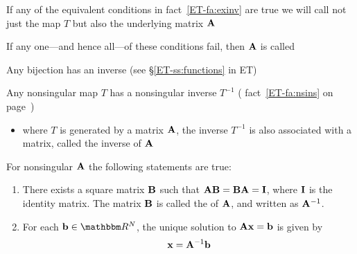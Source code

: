 \begin{frame}

    \vspace{2em}
    If any of the equivalent conditions in
    fact~\ref{ET-fa:exinv} are true we will call not just the map $T$ but also the
    underlying matrix $\mathbf A$ 
    
    \vspace{.7em}
    If any one---and hence all---of
    these conditions fail, then $\mathbf A$ is called 
    
\end{frame}

\begin{frame}
    
    \vspace{2em}
    Any bijection has an inverse (see \S\ref{ET-ss:functions} in ET)
    
    \vspace{.7em}
    Any nonsingular map $T$ has a nonsingular inverse $T^{-1}$ (
    fact~\ref{ET-fa:nsins} on page~\pageref{ET-fa:nsins})
    
    \begin{itemize}
        \item where $T$ is generated by a matrix $\mathbf A$, the inverse $T^{-1}$ is also
        associated with a matrix, called the inverse of $\mathbf A$ 
    \end{itemize}

\end{frame}

\begin{frame}

    \vspace{2em}    
    \Thm{\eqref{ET-t:nonsigmat}}
        For nonsingular $\mathbf A$ the following statements are true:
        \begin{enumerate}
            \item There exists a square matrix $\mathbf B$ such that $\mathbf A
                \mathbf B = \mathbf B \mathbf A = \mathbf I$, where $\mathbf I$ is the
                identity matrix.  The matrix $\mathbf B$ is called the 
                of $\mathbf A$, and written as $\mathbf A^{-1}$.
            \item For each $\boldb \in \RR^N$, the unique solution to $\mathbf A {\mathbf x} =
                {\mathbf b}$ is given by 
                    \begin{equation*}
                        \label{eq:sofox}
                        {\mathbf x} = \mathbf A^{-1} {\mathbf b}
                    \end{equation*}
        \end{enumerate}

\end{frame}

